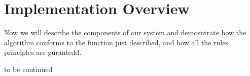 \documentclass[a4paper, 11pt]{article}
\begin{document}
\section{Implementation Overview}

Now we will describe the components of our system and demosntrate how the algorithm conforms to the function just described, and how all the rules principles are gurantedd. 









to be continued

\end{document}

